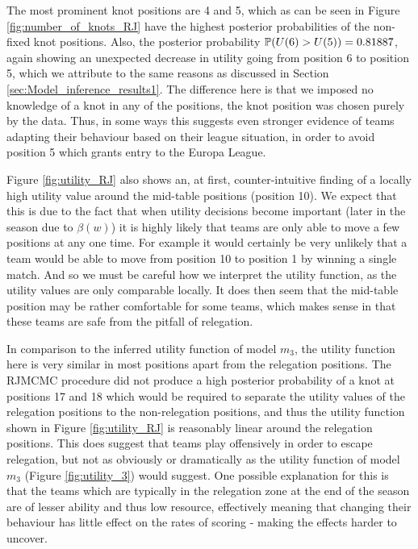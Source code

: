 The most prominent knot positions are 4 and 5, which as can be seen in Figure \ref{fig:number_of_knots_RJ} have the
highest posterior probabilities of the non-fixed knot positions. Also, the posterior probability \(\mathbb{P}(U(6) > U(5)) =
0.81887\), again showing an unexpected decrease in utility going from position 6 to position 5, which we attribute to
the same reasons as discussed in Section \ref{sec:Model_inference_results1}. The difference here is that we imposed no
knowledge of a knot in any of the positions, the knot position was chosen purely by the data. Thus, in some ways this
suggests even stronger evidence of teams adapting their behaviour based on their league situation, in order to avoid
position 5 which grants entry to the Europa League.

Figure \ref{fig:utility_RJ} also shows an, at first, counter-intuitive finding of a locally high utility value around
the mid-table positions (position 10). We expect that this is due to the fact that when utility decisions become
important (later in the season due to \(\beta(w)\)) it is highly likely that teams are only able to move a few positions
at any one time. For example it would certainly be very unlikely that a team would be able to move from position 10 to
position 1 by winning a single match. And so we must be careful how we interpret the utility function, as the utility
values are only comparable locally. It does then seem that the mid-table position may be rather comfortable for some
teams, which makes sense in that these teams are safe from the pitfall of relegation.

In comparison to the inferred utility function of model \(m_3\), the utility function here is very similar in most
positions apart from the relegation positions. The \gls{RJMCMC} procedure did not produce a high posterior probability
of a knot at positions 17 and 18 which would be required to separate the utility values of the relegation positions to
the non-relegation positions, and thus the utility function shown in Figure \ref{fig:utility_RJ} is reasonably linear
around the relegation positions. This does suggest that teams play offensively in order to escape relegation, but not as
obviously or dramatically as the utility function of model \(m_3\) (Figure \ref{fig:utility_3}) would suggest. One
possible explanation for this is that the teams which are typically in the relegation zone at the end of the season are
of lesser ability and thus low resource, effectively meaning that changing their behaviour has little effect on the rates
of scoring - making the effects harder to uncover.

